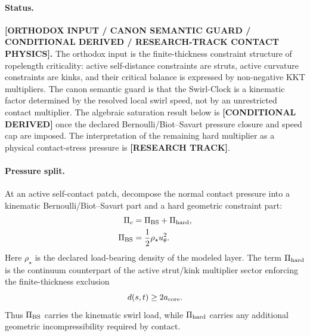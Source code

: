 \paragraph{Status.}
\textbf{[ORTHODOX INPUT / CANON SEMANTIC GUARD / CONDITIONAL DERIVED / RESEARCH-TRACK CONTACT PHYSICS].}
The orthodox input is the finite-thickness constraint structure of ropelength
criticality: active self-distance constraints are struts, active curvature
constraints are kinks, and their critical balance is expressed by non-negative
KKT multipliers.  The canon semantic guard is that the Swirl-Clock is a
kinematic factor determined by the resolved local swirl speed, not by an
unrestricted contact multiplier.  The algebraic saturation result below is
\textbf{[CONDITIONAL DERIVED]} once the declared Bernoulli/Biot--Savart pressure
closure and speed cap are imposed.  The interpretation of the remaining hard
multiplier as a physical contact-stress pressure is \textbf{[RESEARCH TRACK]}.

\paragraph{Pressure split.}
At an active self-contact patch, decompose the normal contact pressure into a
kinematic Bernoulli/Biot--Savart part and a hard geometric constraint part:
\begin{align}
    \Pi_c
    &=
    \Pi_{\rm BS}
    +
    \Pi_{\rm hard},
    \label{eq:rt_contact_pressure_split}
    \\
    \Pi_{\rm BS}
    &=
    \frac12\rho_\star u_\theta^2 .
    \label{eq:rt_contact_pi_bs}
\end{align}
Here \(\rho_\star\) is the declared load-bearing density of the modeled layer.
The term \(\Pi_{\rm hard}\) is the continuum counterpart of the active
strut/kink multiplier sector enforcing the finite-thickness exclusion
\begin{equation}
    d(s,t)\ge 2a_{\rm core}.
    \label{eq:rt_contact_distance_exclusion}
\end{equation}
Thus \(\Pi_{\rm BS}\) carries the kinematic swirl load, while
\(\Pi_{\rm hard}\) carries any additional geometric incompressibility required
by contact.

